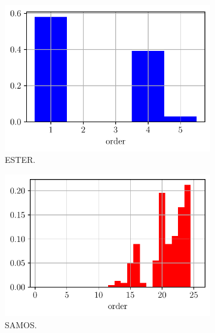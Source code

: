         \begin{figure}
            \centering
            \begin{subfigure}{0.3\linewidth}
                \centering
                \includegraphics[width = \linewidth]{Figuras/orden_ester_UWB.pdf}
                \caption{ESTER.}
            \end{subfigure}
            \begin{subfigure}{0.3\linewidth}
                \centering
                \includegraphics[width = \linewidth]{Figuras/orden_samos_UWB.pdf}
                \caption{SAMOS.}
            \end{subfigure}
            \begin{subfigure}{0.3\linewidth}
                \centering

\end{subfigure}
\end{figure}
